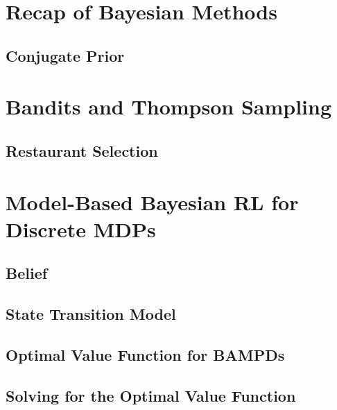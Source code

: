 	\section{Recap of Bayesian Methods} %

		\subsection{Conjugate Prior} %

	\section{Bandits and Thompson Sampling} %

		\subsection{Restaurant Selection} %

	\section{Model-Based Bayesian RL for Discrete MDPs} %

		\subsection{Belief} %

		\subsection{State Transition Model} %

		\subsection{Optimal Value Function for BAMPDs} %

		\subsection{Solving for the Optimal Value Function} %

